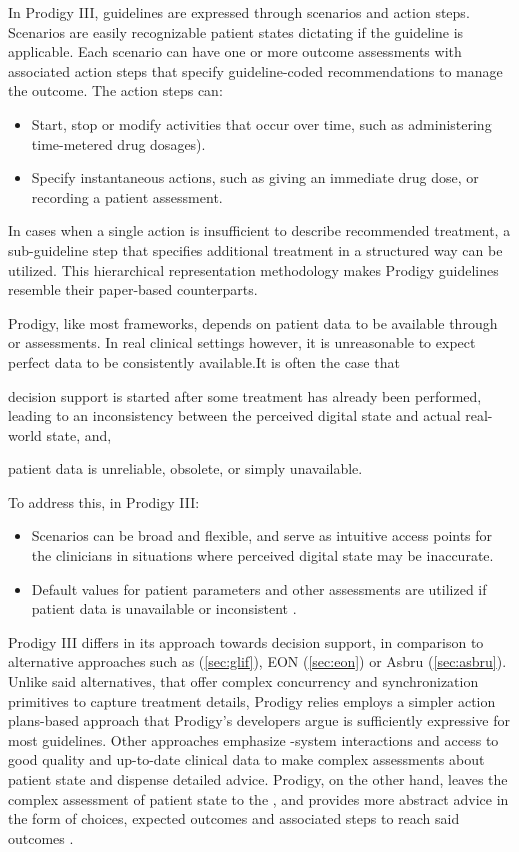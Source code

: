 In Prodigy III, guidelines are expressed through scenarios and action steps.
Scenarios are easily recognizable patient states dictating if the guideline
is applicable. Each scenario can have one or more outcome assessments with
associated action steps that specify guideline-coded recommendations to manage
the outcome. The action steps can:
\begin{itemize}
  \item Start, stop or modify activities that occur over time, such as
    administering time-metered drug dosages).
  \item Specify instantaneous actions, such as giving an immediate drug dose,
    or recording a patient assessment.
\end{itemize}
In cases when a single action is insufficient to describe recommended treatment,
a sub-guideline step that specifies additional treatment in a structured way
can be utilized. This hierarchical representation methodology makes Prodigy
guidelines resemble their paper-based counterparts.

Prodigy, like most \CDSSs{} frameworks, depends on patient data to
be available through \EHRs{} or \HCP{} assessments. In real clinical settings
however, it is unreasonable to expect perfect data to be consistently
available.It is often the case that
\begin{enumerate*}[label=(\alph*)]
  \item decision support is started after some treatment has already
    been performed, leading to an inconsistency between the perceived
    digital state and actual real-world state, and,
  \item patient data is unreliable, obsolete, or simply unavailable.
\end{enumerate*}
To address this, in Prodigy III:
\begin{itemize}
  \item Scenarios can be broad and flexible, and serve as intuitive access points for
    the clinicians in situations where perceived digital state may be
    inaccurate.
  \item Default values for patient parameters and other assessments are utilized
    if patient data is unavailable or inconsistent \cite{JohnsonAMIA00}.
\end{itemize}

Prodigy III differs in its approach towards decision support, in comparison
to alternative approaches such as \GLIF{} (\autoref{sec:glif}), EON (\autoref{sec:eon})
or Asbru (\autoref{sec:asbru}). Unlike said alternatives,
that offer complex concurrency and synchronization primitives to capture
treatment details, Prodigy relies employs a simpler action plans-based approach
that Prodigy's developers argue is sufficiently expressive for most guidelines.
Other approaches emphasize \HCP{}-system interactions and access to good quality
and up-to-date clinical data to make complex assessments about patient state and dispense detailed
advice. Prodigy, on the other hand, leaves the complex assessment of patient
state to the \HCP{}, and provides more abstract advice in the form of choices,
expected outcomes and associated steps to reach said outcomes \cite{JohnsonAMIA00}.


